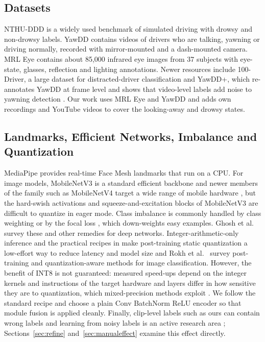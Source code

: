 \documentclass[conference]{IEEEtran}
\begin{document}
\subsection{Datasets}
NTHU-DDD \cite{weng2016} is a widely used benchmark of simulated driving with drowsy and non-drowsy labels. YawDD \cite{yawdd} contains videos of drivers who are talking, yawning or driving normally, recorded with mirror-mounted and a dash-mounted camera. MRL Eye \cite{mrl,fusek2018} contains about 85,000 infrared eye images from 37 subjects with eye-state, glasses, reflection and lighting annotations. Newer resources include 100-Driver, a large dataset for distracted-driver classification \cite{wang2023} and YawDD+, which re-annotates YawDD at frame level and shows that video-level labels add noise to yawning detection \cite{mujtaba2025}. Our work uses MRL Eye and YawDD and adds own recordings and YouTube videos to cover the looking-away and drowsy states.

\subsection{Landmarks, Efficient Networks, Imbalance and Quantization}
MediaPipe \cite{lugaresi2019} provides real-time Face Mesh landmarks \cite{kartynnik2019} that run on a CPU. For image models, MobileNetV3 \cite{howard2019} is a standard efficient backbone and newer members of the family such as MobileNetV4 target a wide range of mobile hardware \cite{qin2024}, but the hard-swish activations and squeeze-and-excitation blocks of MobileNetV3 are difficult to quantize in eager mode. Class imbalance is commonly handled by class weighting or by the focal loss \cite{lin2017}, which down-weights easy examples. Ghosh et al.\cite{ghosh2024} survey these and other remedies for deep networks. Integer-arithmetic-only inference \cite{jacob2018} and the practical recipes in \cite{krishnamoorthi2018} make post-training static quantization a low-effort way to reduce latency and model size and Rokh et al.~\cite{rokh2023} survey post-training and quantization-aware methods for image classification. However, the benefit of INT8 is not guaranteed: measured speed-ups depend on the integer kernels and instructions of the target hardware \cite{shin2026} and layers differ in how sensitive they are to quantization, which mixed-precision methods exploit \cite{ramp2026}. We follow the standard recipe and choose a plain Conv BatchNorm ReLU encoder so that module fusion is applied cleanly. Finally, clip-level labels such as ours can contain wrong labels and learning from noisy labels is an active research area \cite{song2023}; Sections~\ref{sec:refine} and~\ref{sec:manualeffect} examine this effect directly.
\end{document}
